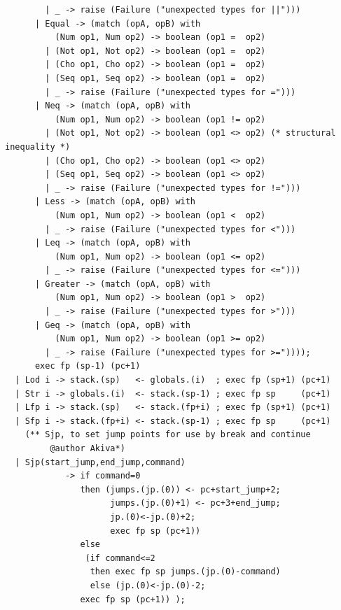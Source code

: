 \documentclass[12pt,A4]{book}
\begin{document}
\begin{verbatim}
        | _ -> raise (Failure ("unexpected types for ||")))
      | Equal -> (match (opA, opB) with 
          (Num op1, Num op2) -> boolean (op1 =  op2)
		| (Not op1, Not op2) -> boolean (op1 =  op2)
		| (Cho op1, Cho op2) -> boolean (op1 =  op2)
		| (Seq op1, Seq op2) -> boolean (op1 =  op2)
        | _ -> raise (Failure ("unexpected types for =")))
      | Neq -> (match (opA, opB) with
          (Num op1, Num op2) -> boolean (op1 != op2)
		| (Not op1, Not op2) -> boolean (op1 <> op2) (* structural inequality *)
		| (Cho op1, Cho op2) -> boolean (op1 <> op2)
		| (Seq op1, Seq op2) -> boolean (op1 <> op2)
        | _ -> raise (Failure ("unexpected types for !=")))
      | Less -> (match (opA, opB) with 
          (Num op1, Num op2) -> boolean (op1 <  op2)
        | _ -> raise (Failure ("unexpected types for <")))
      | Leq -> (match (opA, opB) with 
          (Num op1, Num op2) -> boolean (op1 <= op2)
        | _ -> raise (Failure ("unexpected types for <=")))
      | Greater -> (match (opA, opB) with 
          (Num op1, Num op2) -> boolean (op1 >  op2)
        | _ -> raise (Failure ("unexpected types for >")))
      | Geq -> (match (opA, opB) with 
          (Num op1, Num op2) -> boolean (op1 >= op2)
        | _ -> raise (Failure ("unexpected types for >="))));
      exec fp (sp-1) (pc+1)
  | Lod i -> stack.(sp)   <- globals.(i)  ; exec fp (sp+1) (pc+1)
  | Str i -> globals.(i)  <- stack.(sp-1) ; exec fp sp     (pc+1)
  | Lfp i -> stack.(sp)   <- stack.(fp+i) ; exec fp (sp+1) (pc+1)
  | Sfp i -> stack.(fp+i) <- stack.(sp-1) ; exec fp sp     (pc+1)
    (** Sjp, to set jump points for use by break and continue 
         @author Akiva*)
  | Sjp(start_jump,end_jump,command)
            -> if command=0 
               then (jumps.(jp.(0)) <- pc+start_jump+2; 
                     jumps.(jp.(0)+1) <- pc+3+end_jump;
                     jp.(0)<-jp.(0)+2;
                     exec fp sp (pc+1))
               else 
                (if command<=2  
                 then exec fp sp jumps.(jp.(0)-command)
                 else (jp.(0)<-jp.(0)-2; 
               exec fp sp (pc+1)) ); 


\end{verbatim}
\end{document}
